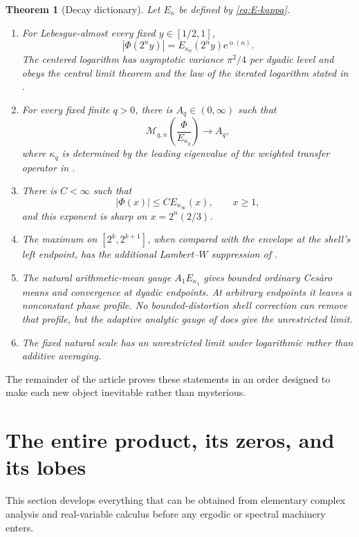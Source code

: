 \documentclass[11pt,oneside]{article}
\numberwithin{equation}{section}
\newtheorem{theorem}{Theorem}[section]
\theoremstyle{definition}
\theoremstyle{remark}
\newcommand{\e}{\mathrm e}
\newcommand{\abs}[1]{\left|#1\right|}
\newcommand{\littleo}{\mathop{o}}
\newcommand{\PhiUp}{\Phi}
\begin{document}
\begin{theorem}[Decay dictionary]
\label{thm:decay-dictionary}
Let \(E_\kappa\) be defined by \eqref{eq:E-kappa}.
\begin{enumerate}
\item For Lebesgue-almost every fixed \(y\in[1/2,1]\),
\[
 \abs{\PhiUp(2^ny)}=E_{\kappa_0}(2^ny)\e^{\littleo(n)}.
\]
The centered logarithm has asymptotic variance \(\pi^2/4\) per dyadic level and obeys the
central limit theorem and the law of the iterated logarithm stated in
.
\item For every fixed finite \(q>0\), there is \(A_q\in(0,\infty)\) such that
\[
 \mathcal M_{q,n}\!\left(\frac{\PhiUp}{E_{\kappa_q}}\right)\longrightarrow A_q,
\]
where \(\kappa_q\) is determined by the leading eigenvalue of the weighted transfer
operator in .
\item There is \(C<\infty\) such that
\[
 \abs{\PhiUp(x)}\le C E_{\kappa_\infty}(x),\qquad x\ge1,
\]
and this exponent is sharp on \(x=2^n(2/3)\).
\item The maximum on \([2^k,2^{k+1}]\), when compared with the envelope at the shell's left
endpoint, has the additional Lambert--\(W\) suppression of .
\item The natural arithmetic-mean gauge \(A_1E_{\kappa_1}\) gives bounded ordinary Ces\`aro
means and convergence at dyadic endpoints.  At arbitrary endpoints it leaves a nonconstant
phase profile.  No bounded-distortion shell correction can remove that profile, but the
adaptive analytic gauge of  does give the unrestricted limit.
\item The fixed natural scale has an unrestricted limit under logarithmic rather than
additive averaging.
\end{enumerate}
\end{theorem}

The remainder of the article proves these statements in an order designed to make each new
object inevitable rather than mysterious.

\section{The entire product, its zeros, and its lobes}
\label{sec:products}

This section develops everything that can be obtained from elementary complex analysis and
real-variable calculus before any ergodic or spectral machinery enters.
\end{document}
